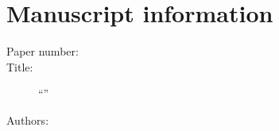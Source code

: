 \section*{Manuscript information}

\begin{description}
\item[Paper number:] \PaperId
\item[Title:] ``\PaperTitle''
\item[Authors:] \AuthorsInLetter
\end{description}
